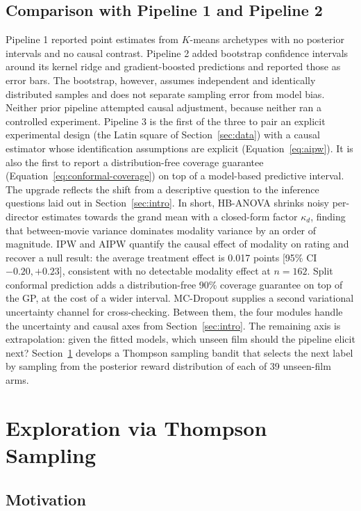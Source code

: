 \documentclass{article}
\begin{document}
\subsection{Comparison with Pipeline 1 and Pipeline 2}

Pipeline 1 reported point estimates from $K$-means archetypes with no posterior intervals and no causal contrast. Pipeline 2 added bootstrap confidence intervals around its kernel ridge and gradient-boosted predictions and reported those as error bars. The bootstrap, however, assumes independent and identically distributed samples and does not separate sampling error from model bias. Neither prior pipeline attempted causal adjustment, because neither ran a controlled experiment. Pipeline 3 is the first of the three to pair an explicit experimental design (the Latin square of Section~\ref{sec:data}) with a causal estimator whose identification assumptions are explicit (Equation~\ref{eq:aipw}). It is also the first to report a distribution-free coverage guarantee (Equation~\ref{eq:conformal-coverage}) on top of a model-based predictive interval. The upgrade reflects the shift from a descriptive question to the inference questions laid out in Section~\ref{sec:intro}. In short, HB-ANOVA shrinks noisy per-director estimates towards the grand mean with a closed-form factor $\kappa_d$, finding that between-movie variance dominates modality variance by an order of magnitude. IPW and AIPW quantify the causal effect of modality on rating and recover a null result: the average treatment effect is 0.017 points [95\% CI $-0.20, +0.23$], consistent with no detectable modality effect at $n = 162$. Split conformal prediction adds a distribution-free 90\% coverage guarantee on top of the GP, at the cost of a wider interval. MC-Dropout supplies a second variational uncertainty channel for cross-checking. Between them, the four modules handle the uncertainty and causal axes from Section~\ref{sec:intro}. The remaining axis is extrapolation: given the fitted models, which unseen film should the pipeline elicit next? Section~\ref{sec:thompson} develops a Thompson sampling bandit that selects the next label by sampling from the posterior reward distribution of each of 39 unseen-film arms.

\section{Exploration via Thompson Sampling}
\label{sec:thompson}

\subsection{Motivation}
\end{document}
